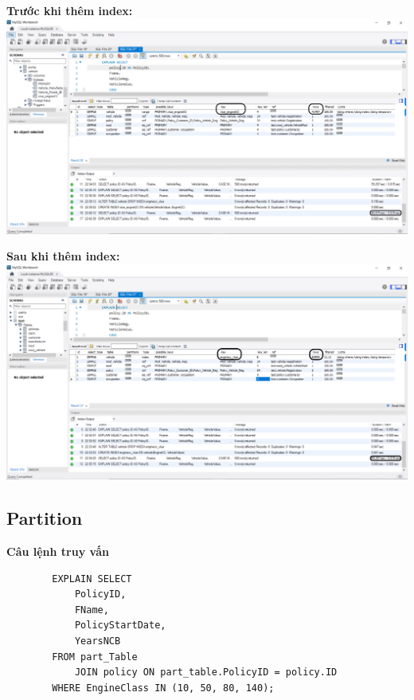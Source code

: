 \documentclass[12pt,a4paper]{report}
\begin{document}
	{\bf Trước khi thêm index:}
	\\
	\includegraphics[width=\linewidth]{BeforeIndexing}
	
	{\bf Sau khi thêm index:}
	\\
	\includegraphics[width=\linewidth]{AfterIndexing}
\subsection{Partition}
	{\bf Câu lệnh truy vấn}
	\begin{lstlisting}
		EXPLAIN SELECT 
			PolicyID,
    		FName,
    		PolicyStartDate,
    		YearsNCB
		FROM part_Table
			JOIN policy ON part_table.PolicyID = policy.ID
		WHERE EngineClass IN (10, 50, 80, 140);
	\end{lstlisting}
	
\end{document}
